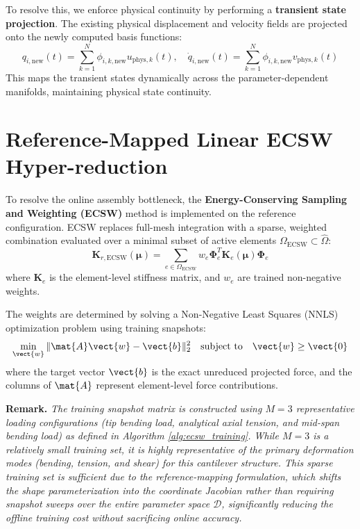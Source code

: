 To resolve this, we enforce physical continuity by performing a \textbf{transient state projection}. The existing physical displacement and velocity fields are projected onto the newly computed basis functions:
\begin{equation}
    q_{i, \text{new}}(t) = \sum_{k=1}^N \phi_{i, k, \text{new}} u_{\text{phys}, k}(t), \quad \dot{q}_{i, \text{new}}(t) = \sum_{k=1}^N \phi_{i, k, \text{new}} v_{\text{phys}, k}(t)
\end{equation}
This maps the transient states dynamically across the parameter-dependent manifolds, maintaining physical state continuity.

\section{Reference-Mapped Linear ECSW Hyper-reduction} \label{sec:ecsw}
To resolve the online assembly bottleneck, the \textbf{Energy-Conserving Sampling and Weighting (ECSW)} method \cite{Farhat2014} is implemented on the reference configuration. ECSW replaces full-mesh integration with a sparse, weighted combination evaluated over a minimal subset of active elements $\Omega_{\text{ECSW}} \subset \hat{\Omega}$:
\begin{equation}
    \mathbf{K}_{r, \text{ECSW}}(\boldsymbol{\mu}) = \sum_{e \in \Omega_{\text{ECSW}}} w_e \boldsymbol{\Phi}_e^T \mathbf{K}_{e}(\boldsymbol{\mu}) \boldsymbol{\Phi}_e
\end{equation}
where $\mathbf{K}_{e}$ is the element-level stiffness matrix, and $w_e$ are trained non-negative weights.

The weights are determined by solving a Non-Negative Least Squares (NNLS) optimization problem using training snapshots:
\begin{equation}
    \min_{\vect{w}} \|\mat{A}\vect{w} - \vect{b}\|_2^2 \quad \text{subject to} \quad \vect{w} \ge \vect{0}
\end{equation}
where the target vector $\vect{b}$ is the exact unreduced projected force, and the columns of $\mat{A}$ represent element-level force contributions.

\noindent\textbf{Remark.} \textit{The training snapshot matrix is constructed using $M = 3$ representative loading configurations (tip bending load, analytical axial tension, and mid-span bending load) as defined in Algorithm \ref{alg:ecsw_training}. While $M = 3$ is a relatively small training set, it is highly representative of the primary deformation modes (bending, tension, and shear) for this cantilever structure. This sparse training set is sufficient due to the reference-mapping formulation, which shifts the shape parameterization into the coordinate Jacobian rather than requiring snapshot sweeps over the entire parameter space $\mathcal{D}$, significantly reducing the offline training cost without sacrificing online accuracy.}

